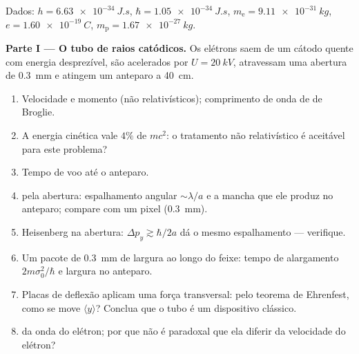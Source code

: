\begin{problem}\label{pb:b2:schrodinger-wave-functions:1}
Dados: $h = \qty{6.63e-34}{J.s}$, $\hbar = \qty{1.05e-34}{J.s}$, $m_{\text{e}} =
\qty{9.11e-31}{kg}$, $e = \qty{1.60e-19}{C}$, $m_{\text{p}} = \qty{1.67e-27}{kg}$.

\textbf{Parte I --- O tubo de raios catódicos.}
Os elétrons saem de um cátodo quente com energia desprezível, são acelerados
por $U = \qty{20}{kV}$, atravessam uma abertura de \qty{0.3}{mm} e atingem um
anteparo a \qty{40}{cm}.
\begin{enumerate}
  \item Velocidade e momento (não relativísticos); comprimento de onda de de Broglie.
  \item A energia cinética vale $4\%$ de $mc^2$: o tratamento não relativístico
        é aceitável para este problema?
  \item Tempo de voo até o anteparo.
  \item {} pela abertura: espalhamento angular $\sim\lambda/a$ e
        a mancha que ele produz no anteparo; compare com um pixel
        (\qty{0.3}{mm}).
  \item Heisenberg na abertura: $\Delta p_y \gtrsim \hbar/2a$ dá o
        mesmo espalhamento --- verifique.
  \item Um pacote de \qty{0.3}{mm} de largura ao longo do feixe: tempo de alargamento
        $2m\sigma_0^2/\hbar$ e largura no anteparo.
  \item Placas de deflexão aplicam uma força transversal: pelo teorema de Ehrenfest, como
        se move $\langle y\rangle$? Conclua que o tubo é um
        dispositivo clássico.
  \item {} da onda do elétron; por que não é paradoxal que
        ela diferir da velocidade do elétron?
\end{enumerate}


\end{problem}
